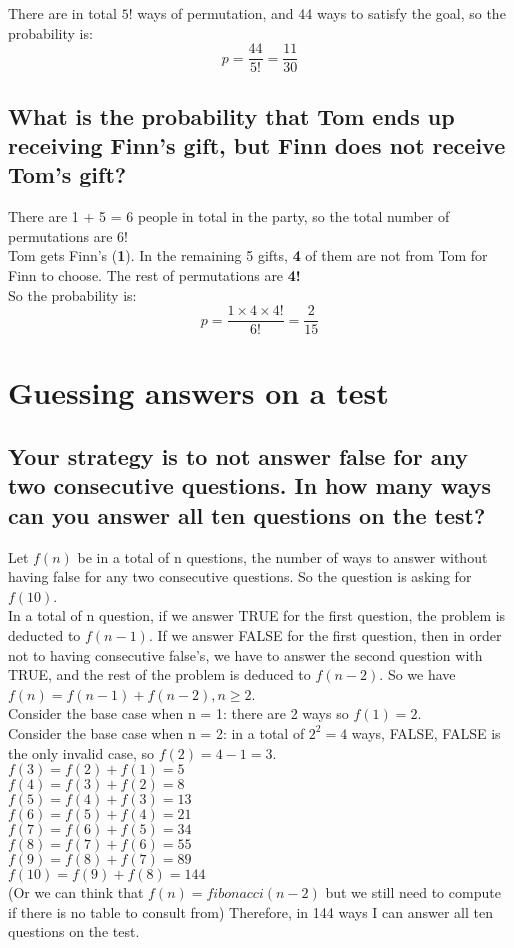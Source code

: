\documentclass{article}
\begin{document}
There are in total \( 5! \) ways of permutation, and 44 ways to satisfy the goal, so the probability is:
\[
p = \frac{44}{5!} = \frac{11}{30}
\]

\subsection{What is the probability that Tom ends up receiving Finn's gift, but Finn does not receive Tom's gift?}

There are 1 + 5 = 6 people in total in the party, so the total number of permutations are 6! \\
Tom gets Finn's (\textbf{1}). In the remaining 5 gifts, \textbf{4} of them are not from Tom for Finn to choose. The rest of permutations are \textbf{4!}\\
So the probability is:
\[
p = \frac{1 \times 4 \times 4! }{6!} = \frac{2}{15}
\]

\section{Guessing answers on a test}

\subsection{Your strategy is to not answer false for any two consecutive questions. In how many ways can you answer all ten questions on the test?}

Let \( f(n) \) be in a total of n questions, the number of ways to answer without having false for any two consecutive questions. So the question is asking for \( f(10) \). \\
In a total of n question, if we answer TRUE for the first question, the problem is deducted to \( f(n-1) \). If we answer FALSE for the first question, then in order not to having consecutive false's, we have to answer the second question with TRUE, and the rest of the problem is deduced to \( f(n-2) \). So we have \( f(n) = f(n-1) + f(n-2), n \geq 2 \). \\
Consider the base case when n = 1: there are 2 ways so \( f(1) = 2 \). \\
Consider the base case when n = 2: in a total of \( 2^2 = 4 \) ways, FALSE, FALSE is the only invalid case, so \( f(2) = 4 - 1 = 3\). \\
\( f(3) = f(2) + f(1) = 5 \) \\ 
\( f(4) = f(3) + f(2) = 8 \) \\ 
\( f(5) = f(4) + f(3) = 13 \) \\ 
\( f(6) = f(5) + f(4) = 21 \) \\ 
\( f(7) = f(6) + f(5) = 34 \) \\ 
\( f(8) = f(7) + f(6) = 55 \) \\ 
\( f(9) = f(8) + f(7) = 89 \) \\ 
\( f(10) = f(9) + f(8) = 144 \) \\
 (Or we can think that \(f(n) = fibonacci(n-2) \) but we still need to compute if there is no table to consult from)
 Therefore, in 144 ways I can answer all ten questions on the test.
\end{document}
